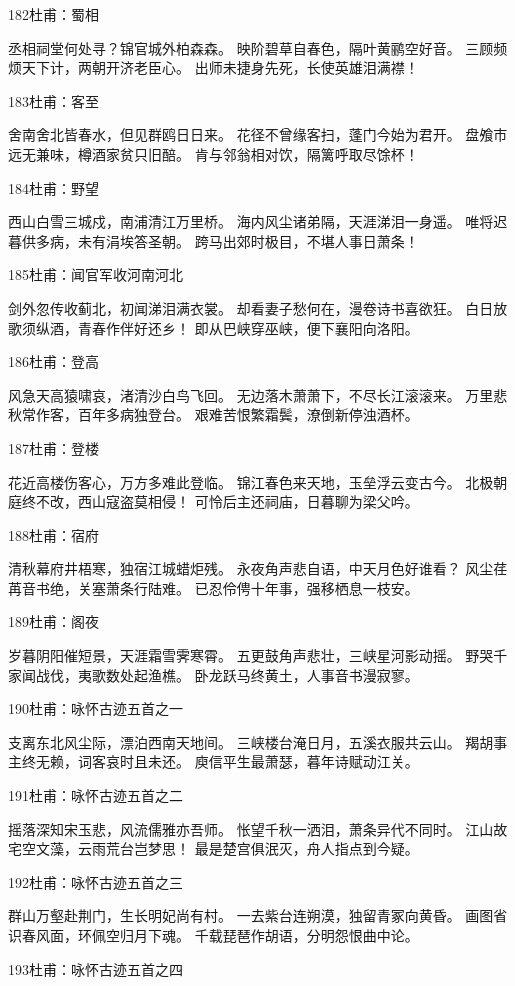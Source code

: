 182杜甫：蜀相

丞相祠堂何处寻？锦官城外柏森森。
映阶碧草自春色，隔叶黄鹂空好音。
三顾频烦天下计，两朝开济老臣心。
出师未捷身先死，长使英雄泪满襟！

183杜甫：客至

舍南舍北皆春水，但见群鸥日日来。
花径不曾缘客扫，蓬门今始为君开。
盘飧市远无兼味，樽酒家贫只旧醅。
肯与邻翁相对饮，隔篱呼取尽馀杯！

184杜甫：野望

西山白雪三城戍，南浦清江万里桥。
海内风尘诸弟隔，天涯涕泪一身遥。
唯将迟暮供多病，未有涓埃答圣朝。
跨马出郊时极目，不堪人事日萧条！

185杜甫：闻官军收河南河北

剑外忽传收蓟北，初闻涕泪满衣裳。
却看妻子愁何在，漫卷诗书喜欲狂。
白日放歌须纵酒，青春作伴好还乡！
即从巴峡穿巫峡，便下襄阳向洛阳。

186杜甫：登高

风急天高猿啸哀，渚清沙白鸟飞回。
无边落木萧萧下，不尽长江滚滚来。
万里悲秋常作客，百年多病独登台。
艰难苦恨繁霜鬓，潦倒新停浊酒杯。

187杜甫：登楼

花近高楼伤客心，万方多难此登临。
锦江春色来天地，玉垒浮云变古今。
北极朝庭终不改，西山寇盗莫相侵！
可怜后主还祠庙，日暮聊为梁父吟。

188杜甫：宿府

清秋幕府井梧寒，独宿江城蜡炬残。
永夜角声悲自语，中天月色好谁看？
风尘荏苒音书绝，关塞萧条行陆难。
已忍伶俜十年事，强移栖息一枝安。

189杜甫：阁夜

岁暮阴阳催短景，天涯霜雪霁寒霄。
五更鼓角声悲壮，三峡星河影动摇。
野哭千家闻战伐，夷歌数处起渔樵。
卧龙跃马终黄土，人事音书漫寂寥。

190杜甫：咏怀古迹五首之一

支离东北风尘际，漂泊西南天地间。
三峡楼台淹日月，五溪衣服共云山。
羯胡事主终无赖，词客哀时且未还。
庾信平生最萧瑟，暮年诗赋动江关。

191杜甫：咏怀古迹五首之二

摇落深知宋玉悲，风流儒雅亦吾师。
怅望千秋一洒泪，萧条异代不同时。
江山故宅空文藻，云雨荒台岂梦思！
最是楚宫俱泯灭，舟人指点到今疑。

192杜甫：咏怀古迹五首之三

群山万壑赴荆门，生长明妃尚有村。
一去紫台连朔漠，独留青冢向黄昏。
画图省识春风面，环佩空归月下魂。
千载琵琶作胡语，分明怨恨曲中论。

193杜甫：咏怀古迹五首之四

